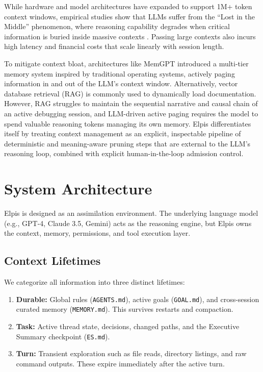 \documentclass[conference]{IEEEtran}
\begin{document}
While hardware and model architectures have expanded to support 1M+ token context windows, empirical studies show that LLMs suffer from the ``Lost in the Middle'' phenomenon, where reasoning capability degrades when critical information is buried inside massive contexts \cite{liu2024lost}. Passing large contexts also incurs high latency and financial costs that scale linearly with session length.

To mitigate context bloat, architectures like MemGPT \cite{packer2023memgpt} introduced a multi-tier memory system inspired by traditional operating systems, actively paging information in and out of the LLM's context window. Alternatively, vector database retrieval (RAG) \cite{lewis2020retrieval} is commonly used to dynamically load documentation. However, RAG struggles to maintain the sequential narrative and causal chain of an active debugging session, and LLM-driven active paging requires the model to spend valuable reasoning tokens managing its own memory. Elpis differentiates itself by treating context management as an explicit, inspectable pipeline of deterministic and meaning-aware pruning steps that are external to the LLM's reasoning loop, combined with explicit human-in-the-loop admission control.

\section{System Architecture}

Elpis is designed as an assimilation environment. The underlying language model (e.g., GPT-4, Claude 3.5, Gemini) acts as the reasoning engine, but Elpis owns the context, memory, permissions, and tool execution layer.

\subsection{Context Lifetimes}
We categorize all information into three distinct lifetimes:
\begin{enumerate}
    \item \textbf{Durable:} Global rules (\texttt{AGENTS.md}), active goals (\texttt{GOAL.md}), and cross-session curated memory (\texttt{MEMORY.md}). This survives restarts and compaction.
    \item \textbf{Task:} Active thread state, decisions, changed paths, and the Executive Summary checkpoint (\texttt{ES.md}).
    \item \textbf{Turn:} Transient exploration such as file reads, directory listings, and raw command outputs. These expire immediately after the active turn.
\end{enumerate}
\end{document}
